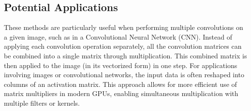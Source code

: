 \documentclass[12pt]{article}
\begin{document}
\subsection*{Potential Applications}
These methods are particularly useful when performing multiple convolutions on a given image, such as in a Convolutional Neural Network (CNN). Instead of applying each convolution operation separately, all the convolution matrices can be combined into a single matrix through multiplication. This combined matrix is then applied to the image (in its vectorized form) in one step. For applications involving images or convolutional networks, the input data is often reshaped into columns of an activation matrix. This approach allows for more efficient use of matrix multipliers in modern GPUs, enabling simultaneous multiplication with multiple filters or kernels.
\end{document}
